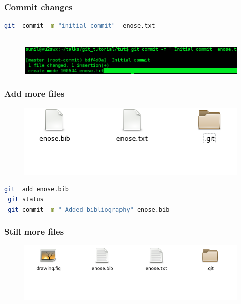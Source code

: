 \documentclass[10pt,a4paper]{beamer}
\begin{document}
\begin{frame}[fragile]
\frametitle{ Commit changes }
 \begin{lstlisting}[language=bash]
 git  commit -m "initial commit"  enose.txt
 
\end{lstlisting}
\begin{figure}
  \includegraphics[scale=.4]{8}
 \end{figure}
 

\end{frame}

\begin{frame}[fragile]
\frametitle{  Add more files}

\begin{figure}
  \includegraphics[scale=.4]{9}
 \end{figure}

  \begin{lstlisting}[language=bash]
 git  add enose.bib
 git status 
 git commit -m " Added bibliography" enose.bib
\end{lstlisting}

\end{frame}


\begin{frame}
\frametitle{  Still more files }
\begin{figure}
  \includegraphics[scale=.4]{10}
 \end{figure}
 
% 
\end{frame}
\end{document}
